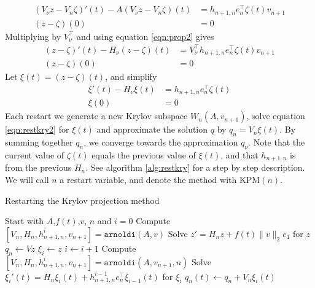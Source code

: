 \begin{equation*}%
\begin{aligned}
 (V_\nu z-V_n \zeta)'(t)-A (V_\nu z-V_n \zeta)(t) &=  h_{n+1,n}e_n^\top \zeta(t) v_{n+1}  \\
(z-\zeta)(0)& = 0
\end{aligned}
\end{equation*}
Multiplying by $V_\nu^{\top}$ and using equation \eqref{eqn:prop2} gives
\begin{equation*}
\begin{aligned}
 (z-\zeta)'(t)-H_\nu (z-\zeta)(t) &= V_\nu^\top h_{n+1,n}e_n^\top \zeta(t) v_{n+1}  \\
(z-\zeta)(0)& = 0
\end{aligned}
\end{equation*}
Let $\xi(t) = (z-\zeta)(t)$, and simplify
\begin{equation}\label{eqn:restkry2}
\begin{aligned}
 \xi '(t) -H_\nu \xi(t) &= h_{n+1,n}e_n^\top \zeta (t)  \\
\xi(0)& = 0
\end{aligned}
\end{equation}
Each restart we generate a new Krylov subspace $W_n(A,v_{n+1})$, solve equation \eqref{eqn:restkry2} for $\xi(t)$ and approximate the solution $q$ by $ q_n =  V_n\xi(t)$. By summing together $q_n$, we converge towards the approximation $q_\nu$. Note that the current value of $\zeta(t)$ equals the previous value of $\xi(t)$, and that $h_{n+1,n}$ is from the previous $H_n$. See algorithm \ref{alg:restkry} for a step by step description. We will call $n$ a restart variable, and denote the method with KPM$(n)$.
\begin{algorithm}
\begin{algorithmic} \caption{Restarting the Krylov projection method} \label{alg:restkry} 
\STATE Start with $A$,$f(t)$,$v$, $n$ and $i = 0$
\STATE Compute $[V_n,H_n,h_{n+1,n}^i,v_{n+1}] = \texttt{arnoldi}(A,v)$
\STATE Solve $  z' = H_n z + f(t) \| v \|_2 e_1  $ for $z$
\STATE $ q_n \leftarrow  V z $
\STATE $\xi_i \leftarrow z$
    \STATE $i \leftarrow i + 1$
    \STATE Compute $[V_n,H_n,h_{n+1,n}^i,v_{n+1}] = \texttt{arnoldi}(A,v_{n+1},n)$
    \STATE Solve $ \xi_i'(t) = H_n \xi_i(t) + h_{n+1,n}^{i-1}e_n^\top \xi_{i-1}(t)  $ for $\xi_i$
    \STATE $ q_n(t) \leftarrow q_n + V_n \xi_i(t) $
\ENDWHILE
\end{algorithmic} 
\end{algorithm}

